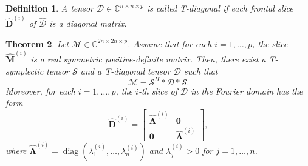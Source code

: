 \documentclass[pdflatex,sn-mathphys-ay]{sn-jnl}
\newcommand{\T}[1]{\mathcal{#1}}    %
\newcommand{\M}[1]{\bm{#1}}     %
\newcommand{\C}{\mathbb{C}}         %
\newcommand{\diag}{\operatorname{diag}}
\theoremstyle{thmstyleone}
\newtheorem{theorem}{Theorem}[section]
\theoremstyle{thmstyletwo}
\theoremstyle{thmstylethree}
\newtheorem{definition}[theorem]{Definition}
\numberwithin{equation}{section}
\begin{document}
\begin{definition}
\label{def:t_diagonal}
A tensor $\T{D} \in \C^{n\times n\times p}$ is called \emph{T-diagonal} if each frontal slice $\widehat{\M{D}}^{(i)}$ of $\widehat{\T{D}}$ is a diagonal matrix.
\end{definition}

\begin{theorem}
\label{thm:t_williamson}
Let $\T{M} \in \C^{2n \times 2n \times p}$. Assume that for each $i=1,\dots,p$, the slice $\widehat{\M{M}}^{(i)}$ is a real symmetric positive-definite matrix. Then, there exist a T-symplectic tensor $\T{S}$ and a T-diagonal tensor $\T{D}$ such that
\begin{equation}
    \T{M} = \T{S}^H * \T{D} * \T{S}.
\end{equation}
Moreover, for each $i=1,\dots,p$, the $i$-th slice of $\T{D}$ in the Fourier domain has the form
\begin{equation}
    \widehat{\M{D}}^{(i)} = \begin{bmatrix} \widehat{\M{\Lambda}}^{(i)} & \M{0} \\ \M{0} & \widehat{\M{\Lambda}}^{(i)} \end{bmatrix},
\end{equation}
where $\widehat{\M{\Lambda}}^{(i)} = \diag(\lambda_1^{(i)},\dots,\lambda_n^{(i)})$ and $\lambda_j^{(i)} > 0$ for $j=1,\dots,n$.
\end{theorem}
\end{document}
